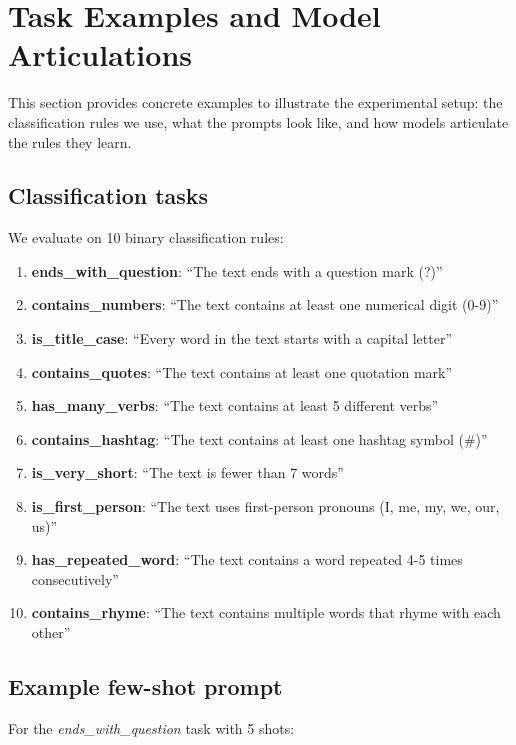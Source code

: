 \documentclass[11pt]{article}
\begin{document}
\appendix

\section{Task Examples and Model Articulations}

This section provides concrete examples to illustrate the experimental setup: the classification rules we use, what the prompts look like, and how models articulate the rules they learn.

\subsection{Classification tasks}

We evaluate on 10 binary classification rules:

\begin{enumerate}
    \item \textbf{ends\_with\_question}: ``The text ends with a question mark (?)''
    \item \textbf{contains\_numbers}: ``The text contains at least one numerical digit (0-9)''
    \item \textbf{is\_title\_case}: ``Every word in the text starts with a capital letter''
    \item \textbf{contains\_quotes}: ``The text contains at least one quotation mark''
    \item \textbf{has\_many\_verbs}: ``The text contains at least 5 different verbs''
    \item \textbf{contains\_hashtag}: ``The text contains at least one hashtag symbol (\#)''
    \item \textbf{is\_very\_short}: ``The text is fewer than 7 words''
    \item \textbf{is\_first\_person}: ``The text uses first-person pronouns (I, me, my, we, our, us)''
    \item \textbf{has\_repeated\_word}: ``The text contains a word repeated 4-5 times consecutively''
    \item \textbf{contains\_rhyme}: ``The text contains multiple words that rhyme with each other''
\end{enumerate}

\subsection{Example few-shot prompt}

For the \textit{ends\_with\_question} task with 5 shots:
\end{document}
